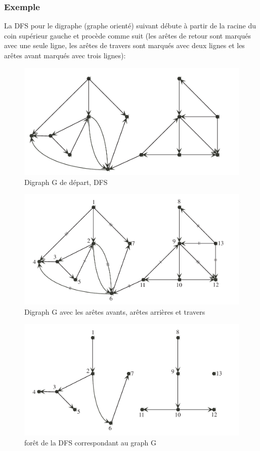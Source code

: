 \subsubsection{Exemple}
La DFS pour le digraphe (graphe orienté) suivant débute à partir de la racine du coin supérieur gauche et procède comme suit (les arêtes de retour sont marqués avec une seule ligne, les arêtes de travers sont marqués avec deux lignes et les arêtes avant marqués avec trois lignes):
\begin{figure}[h]
\centering
\includegraphics[width=0.7\linewidth]{images/grath-oriente-1}
\caption{Digraph G de départ, DFS}
\label{fig:grath-oriente-1}
\end{figure}
\begin{figure}[h]
\centering
\includegraphics[width=0.7\linewidth]{images/grath-oriente-2}
\caption{Digraph G avec les arêtes avants, arêtes arrières et travers}
\label{fig:grath-oriente-2}
\end{figure}
\begin{figure}[h]
\centering
\includegraphics[width=0.7\linewidth]{images/grath-oriente-3}
\caption{forêt de la DFS correspondant au graph G}
\label{fig:grath-oriente-3}
\end{figure}

